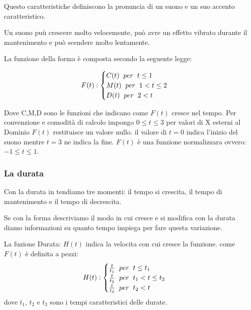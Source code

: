 \documentclass{article}
\begin{document}
Questo caratteristiche definiscono la pronuncia di un suono e un suo accento caratteristico.

Un suono puù crescere molto velocemente, può avre un effetto vibrato durante il mantenimento e può scendere molto lentamente.

La funzione della forma è composta secondo la seguente legge:

$$F(t) : 
\begin{cases}
    C(t)\hspace{0.2cm}per\hspace{0.2cm}t \le 1 \\
    M(t)\hspace{0.2cm}per\hspace{0.2cm}1 < t \le 2\\
    D(t)\hspace{0.2cm}per\hspace{0.2cm}2 < t 
\end{cases}
$$

Dove C,M,D sono le funzioni che indicano come $F(t)$ cresce nel tempo. Per convenzione e comodità di calcolo impongo $0 \le t \le 3$ per valori di X esterni al Dominio $F(t)$ restituisce un valore nullo. il valore di $t = 0$ indica l'inizio del suono mentre $t = 3$ ne indica la fine. $F(t)$ è una funzione normalizzara ovvero: $-1 \le t \le 1$.

\subsubsection{La durata}
Con la durata in tendiamo tre momenti: il tempo si crescita, il tempo di mantenimento e il tempo di decrescita.

Se con la forma descriviamo il modo in cui cresce e si modifica con la durata diamo informazioni su quanto tempo impiega per fare questa variazione.

La fuzione Durata: $H(t)$ indica la velocita con cui cresce la funzione. come $F(t)$ è definita a pezzi:
$$H(t) : 
\begin{cases}
    \frac{t}{t_1} \hspace{0.2cm}per\hspace{0.2cm} t \le t_1 \\
    \frac{t}{t_2} \hspace{0.2cm}per\hspace{0.2cm} t_1 < t \le t_2\\
    \frac{t}{t_3} \hspace{0.2cm}per\hspace{0.2cm} t_2 < t 
\end{cases}
$$
dove $t_1$, $t_2$ e $t_3$ sono i tempi caratteristici delle durate.
\end{document}
